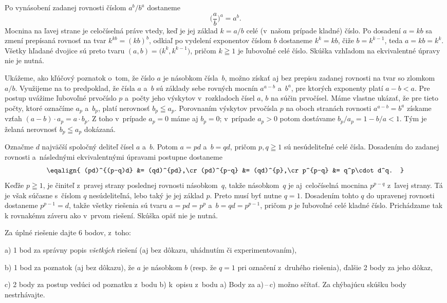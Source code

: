 {%
Po vynásobení zadanej rovnosti číslom $a^b/b^a$ dostaneme
$$
\biggl(\frac{a}{b}\biggr)^a=a^b.
$$
Mocnina na ľavej strane je celočíselná práve vtedy, keď je jej základ
$k=a/b$ celé (v~našom prípade kladné) číslo.
Po dosadení $a=kb$ sa zmení prepísaná
rovnosť na tvar $k^{kb}=(kb)^{b}$, odkiaľ po vydelení exponentov
číslom $b$ dostaneme $k^k=kb$, čiže $b=k^{k-1}$, teda
$a=kb=k^k$. Všetky hľadané dvojice sú preto tvaru
$(a,b)=\bigl(k^k,k^{k-1}\bigr)$, pričom $k\geqq1$ je ľubovoľné celé číslo.
Skúška vzhľadom na ekvivalentné úpravy nie je nutná.

\Pozn
Ukážeme, ako kľúčový poznatok o~tom, že číslo $a$ je násobkom
čísla~$b$, možno získať aj bez prepisu zadanej rovnosti na tvar so
zlomkom $a/b$. Využijeme na to predpoklad, že čísla $a$
a~$b$ sú základy sebe rovných mocnín $a^{a-b}$ a~$b^a$, pre
ktorých exponenty platí $a-b<a$. Pre postup uvážime
ľubovoľné prvočíslo $p$ a~počty jeho výskytov v~rozkladoch čísel
$a$, $b$ na súčin prvočísel. Máme vlastne ukázať, že pre tieto počty,
ktoré označíme $a_p$
a~$b_p$, platí nerovnosť $b_p\leqq a_p$. Porovnaním výskytov
prvočísla $p$ na oboch stranách rovnosti $a^{a-b}\!=\!b^a$ získame
vzťah $(a-b)\cdot a_p\!=\!a\cdot b_p$. Z toho v~prípade
$a_p=0$ máme aj $b_p=0$; v~prípade $a_p>0$ potom dostávame
$b_p/a_p=1-b/a<1$. Tým je želaná nerovnosť $b_p\leqq a_p$
dokázaná.


\Jres %
Označme $d$ najväčší spoločný deliteľ čísel $a$ a~$b$.
Potom $a=pd$ a~$b=qd$, pričom $p,q\geqq1$ sú nesúdeliteľné celé čísla.
Dosadením do zadanej rovnosti a~následnými ekvivalentnými úpravami
postupne dostaneme
$$
\eqalign{
(pd)^{(p-q)d} &= (qd)^{pd},\cr
(pd)^{p-q} &= (qd)^{p},\cr
p^{p-q} &= q^p\cdot d^q.
}
$$
Keďže $p\geqq1$, je činiteľ z~pravej strany poslednej rovnosti
násobkom~$q$, takže násobkom~$q$ je aj~celočíselná mocnina $p^{p-q}$
z~ľavej strany.
Tá je však súčasne s~číslom $q$ nesúdeliteľná, lebo taký
je jej základ $p$. Preto musí byť nutne $q=1$.
Dosadením tohto $q$ do upravenej rovnosti
dostaneme $p^{p-1}=d$, takže všetky riešenia sú tvaru $a=pd=p^p$
a~$b=qd=p^{p-1}$, pričom $p$ je ľubovoľné celé kladné číslo.
Prichádzame tak k rovnakému záveru
ako v~prvom riešení. Skúška opäť nie je nutná.


\schemaABC
Za úplné riešenie dajte 6 bodov, z~toho:
\item{a)} 1 bod za správny popis \emph{všetkých} riešení (aj bez dôkazu,
uhádnutím či experimentovaním),
\item{b)} 1 bod za poznatok (aj bez dôkazu),
že $a$ je násobkom $b$ (resp. že $q=1$ pri označení z~druhého riešenia),
ďalšie 2 body za jeho dôkaz,
\item{c)} 2 body za postup vedúci od poznatku z~bodu b)
k~opisu z~bodu a)
\endgraf\noindent
Body za a)\,--\,c) možno sčítať. Za chýbajúcu skúšku body nestrhávajte.
\endschema
}

